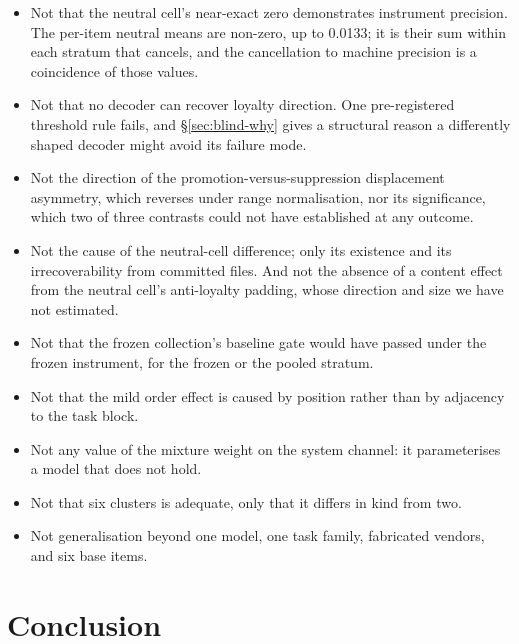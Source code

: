 \documentclass{article}
\begin{document}
\begin{itemize}
  we withdraw it. $\beta$ is reported as a symmetry check on the instrument.
\item Not that the neutral cell's near-exact zero demonstrates instrument
  precision. The per-item neutral means are non-zero, up to 0.0133; it is
  their sum within each stratum that cancels, and the cancellation to machine
  precision is a coincidence of those values.
\item Not that no decoder can recover loyalty direction. One pre-registered
  threshold rule fails, and \S\ref{sec:blind-why} gives a structural reason a
  differently shaped decoder might avoid its failure mode.
\item Not the direction of the promotion-versus-suppression displacement
  asymmetry, which reverses under range normalisation, nor its significance,
  which two of three contrasts could not have established at any outcome.
\item Not the cause of the neutral-cell difference; only its existence and its
  irrecoverability from committed files. And not the absence of a content
  effect from the neutral cell's anti-loyalty padding, whose direction and size
  we have not estimated.
\item Not that the frozen collection's baseline gate would have passed under the
  frozen instrument, for the frozen or the pooled stratum.
\item Not that the mild order effect is caused by position rather than by
  adjacency to the task block.
\item Not any value of the mixture weight on the system channel: it parameterises
  a model that does not hold.
\item Not that six clusters is adequate, only that it differs in kind from two.
\item Not generalisation beyond one model, one task family, fabricated vendors,
  and six base items.
\end{itemize}

\section{Conclusion}
\label{sec:conclusion}
\end{document}
